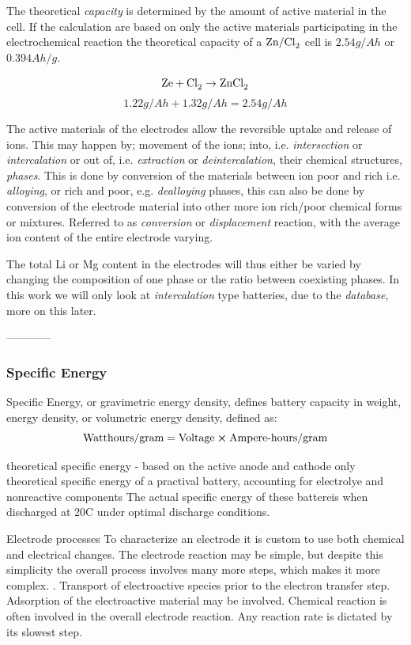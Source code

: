 	
	The theoretical \textit{capacity} is determined by the amount of active material in the cell. If the calculation are based on only the active materials participating in the electrochemical reaction the theoretical capacity of a $\ce{Zn/Cl_2}$ cell is $2.54 \si{g/Ah}$ or $0.394 \si{Ah/g}$.
	
	$$\ce{Ze} + \ce{Cl_2} \rightarrow \ce{ZnCl_2}$$
	$$1.22 \si{g/Ah} + 1.32 \si{g/Ah} = 2.54 \si{g/Ah}$$
	
	
	The active materials of the electrodes allow the reversible uptake and release of ions. This may happen by; movement of the  ions; into, i.e. \textit{intersection} or \textit{intercalation} or out of, i.e. \textit{extraction} or \textit{deintercalation}, their chemical structures, \textit{phases}. This is done by conversion of the materials between ion poor and rich i.e. \textit{alloying}, or rich and poor, e.g. \textit{dealloying} phases, this can also be done by conversion of the electrode material into other more ion rich/poor chemical forms or mixtures. Referred to as \textit{conversion} or \textit{displacement} reaction, with the average ion content of the entire electrode varying. 
	
	The total Li or Mg content in the electrodes will thus either be varied by changing the composition of one phase or the ratio between coexisting phases. In this work we will only look at \textit{intercalation} type batteries, due to the \textit{database}, more on this later.

------------	
	\subsubsection*{Specific Energy}
	Specific Energy, or gravimetric energy density, defines battery capacity in weight, energy density, or volumetric energy density, defined as: 
	\begin{equation}
	\text{Watthours/gram} = \text{Voltage} \cross \text{Ampere-hours/gram}
	\end{equation}	
	
	theoretical specific energy - based on the active anode and cathode only
	theoretical specific energy of a practival battery, accounting for electrolye and nonreactive components
	The actual specific energy of these battereis when discharged at 20C under optimal discharge conditions.  
	

	Electrode processes
	To characterize an electrode it is custom to use both chemical and electrical changes. The electrode reaction may be simple, but despite this simplicity the overall process involves many more steps, which makes it more complex. . Transport of electroactive species prior to the electron transfer step. Adsorption of the electroactive material may be involved. Chemical reaction is often involved in the overall electrode reaction. Any reaction rate is dictated by its slowest step. 
	
